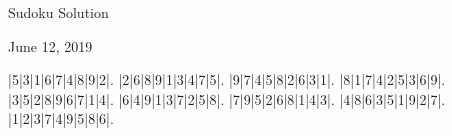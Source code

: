\documentclass{article}
\begin{document}
\begin{center}
\Huge{Sudoku Solution}
\end{center}
\begin{center}
\Large{June 12, 2019}
\end{center}
\begin{sudoku}
|5|3|1|6|7|4|8|9|2|.
|2|6|8|9|1|3|4|7|5|.
|9|7|4|5|8|2|6|3|1|.
|8|1|7|4|2|5|3|6|9|.
|3|5|2|8|9|6|7|1|4|.
|6|4|9|1|3|7|2|5|8|.
|7|9|5|2|6|8|1|4|3|.
|4|8|6|3|5|1|9|2|7|.
|1|2|3|7|4|9|5|8|6|.
\end{sudoku}
\end{document}
